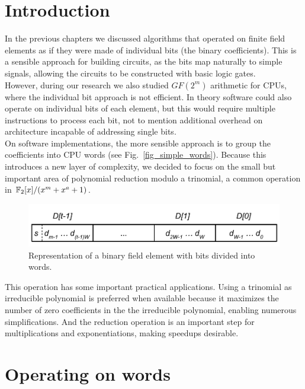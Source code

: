 \section{Introduction}

In the previous chapters we discussed algorithms that operated on finite field elements as if they were made of individual bits (the binary coefficients). This is a sensible approach for building circuits, as the bits map naturally to simple signals, allowing the circuits to be constructed with basic logic gates. \\

However, during our research we also studied $GF(2^m)$ arithmetic for CPUs, where the individual bit approach is not efficient. In theory software could also operate on individual bits of each element, but this would require multiple instructions to process each bit, not to mention additional overhead on architecture incapable of addressing single bits. \\

On software implementations, the more sensible approach is to group the coefficients into CPU words (see Fig.~\ref{fig_simple_words}). Because this introduces a new layer of complexity, we decided to focus on the small but important area of polynomial reduction modulo a trinomial, a common operation in $\mathbb{F}_2[x]/(x^m+x^a+1)$. \\

\begin{figure}
  \caption{Representation of a binary field element with bits divided into words.}
  \label{fig:simple_words}
  \includegraphics[width = .55\columnwidth]{figures/element-word.pdf}
\end{figure}

This operation has some important practical applications. Using a trinomial as irreducible polynomial is  preferred when available because it maximizes the number of zero coefficients in the the irreducible polynomial, enabling numerous simplifications. And the reduction operation is an important step for multiplications and exponentiations, making speedups desirable.

\section{Operating on words}\label{operating-on-words}

